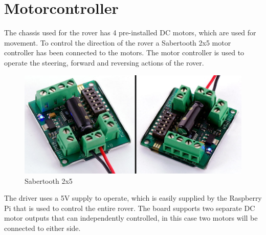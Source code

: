 \clearpage
\section{Motorcontroller}

The chassis used for the rover has 4 pre-installed DC motors, which are used for movement. To control the direction of the rover a Sabertooth 2x5 motor controller has been connected to the motors. The motor controller is used to operate the steering, forward and reversing actions of the rover.

\begin{figure}[H]
	\centering
	\includegraphics[width=.8\linewidth]{images/Sabertooth2X5big.jpg}
	\caption{Sabertooth 2x5\cite{sabertoothpic}}
\end{figure}

The driver uses a 5V supply to operate, which is easily supplied by the Raspberry Pi that is used to control the entire rover. The board supports two separate DC motor outputs that can independently controlled, in this case two motors will be connected to either side.



